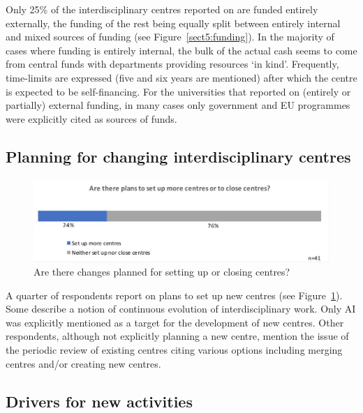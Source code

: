 Only 25\% of the interdisciplinary centres reported on are funded entirely externally, the funding of the rest being equally split between entirely internal and mixed sources of funding (see Figure~\ref{sect5:funding}). In the majority of cases where funding is entirely internal, the bulk of the actual cash seems to come from central funds with departments providing resources `in kind'. Frequently, time-limits are expressed (five and six years are mentioned) after which the centre is expected to be self-financing. For the universities that reported on (entirely or partially) external funding, in many cases only government and EU programmes were explicitly cited as sources of funds.

\subsection{Planning for changing interdisciplinary centres}

\begin{figure}[h]
\centering
\includegraphics[width = \linewidth]{charts/5f.jpg}
\caption{Are there changes planned for setting up or closing centres?}
\label{sect5:changes}
\end{figure}

A quarter of respondents report on plans to set up new centres (see Figure~\ref{sect5:changes}). Some describe a notion of continuous evolution of interdisciplinary work. Only AI was explicitly mentioned as a target for the development of new centres. Other respondents, although not explicitly planning a new centre, mention the issue of the periodic review of existing centres citing various options including merging centres and/or creating new centres.  

\subsection{Drivers for new activities}

